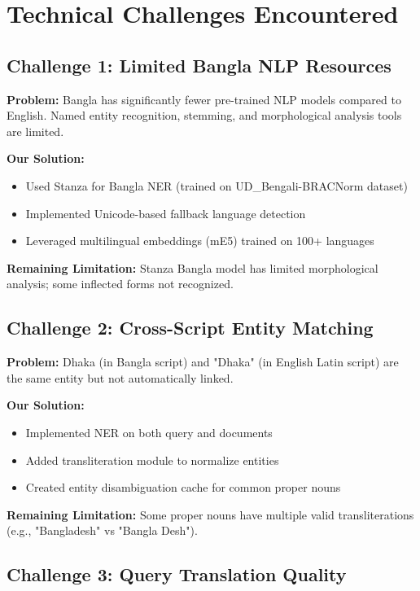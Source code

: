 \documentclass[12pt,a4paper]{report}
\begin{document}
\section{Technical Challenges Encountered}

\subsection{Challenge 1: Limited Bangla NLP Resources}

\textbf{Problem:} Bangla has significantly fewer pre-trained NLP models compared to English. Named entity recognition, stemming, and morphological analysis tools are limited.

\textbf{Our Solution:}
\begin{itemize}
    \item Used Stanza for Bangla NER (trained on UD\_Bengali-BRACNorm dataset)
    \item Implemented Unicode-based fallback language detection
    \item Leveraged multilingual embeddings (mE5) trained on 100+ languages
\end{itemize}

\textbf{Remaining Limitation:} Stanza Bangla model has limited morphological analysis; some inflected forms not recognized.

\subsection{Challenge 2: Cross-Script Entity Matching}

\textbf{Problem:} Dhaka (in Bangla script) and "Dhaka" (in English Latin script) are the same entity but not automatically linked.

\textbf{Our Solution:}
\begin{itemize}
    \item Implemented NER on both query and documents
    \item Added transliteration module to normalize entities
    \item Created entity disambiguation cache for common proper nouns
\end{itemize}

\textbf{Remaining Limitation:} Some proper nouns have multiple valid transliterations (e.g., "Bangladesh" vs "Bangla Desh").

\subsection{Challenge 3: Query Translation Quality}
\end{document}
